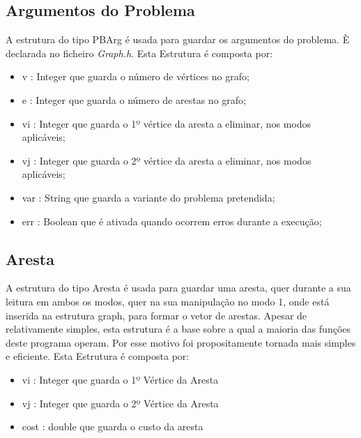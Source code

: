 \documentclass[14pt]{article}
\begin{document}
    \subsection[PBArg]{Argumentos do Problema}\label{subsec:argumentos.problema}
    A estrutura do tipo PBArg é usada para guardar os argumentos do problema. È declarada no ficheiro \emph{Graph.h}.
    Esta Estrutura é composta por:
    \begin{itemize}
        \item v : Integer que guarda o número de vértices no grafo;
        \item e : Integer que guarda o número de arestas no grafo;
        \item vi : Integer que guarda o 1º vértice da aresta a eliminar, nos modos aplicáveis;
        \item vj : Integer que guarda o 2º vértice da aresta a eliminar, nos modos aplicáveis;
        \item var : String que guarda a variante do problema pretendida;
        \item err : Boolean que é ativada quando ocorrem erros durante a execução;
    \end{itemize}

    \subsection[edge]{Aresta}\label{subsec:aresta}
    A estrutura do tipo Aresta é usada para guardar uma aresta, quer durante a sua leitura em ambos os modos, quer na
    sua manipulação no modo 1, onde está inserida na estrutura graph, para formar o vetor de arestas. Apesar de
    relativamente simples, esta estrutura é a base sobre a qual a maioria das funções deste programa operam. Por esse
    motivo foi propositamente tornada mais simples e eficiente.
    Esta Estrutura é composta por:
    \begin{itemize}
        \item vi : Integer que guarda o 1º Vértice da Aresta
        \item vj : Integer que guarda o 2º Vértice da Aresta
        \item cost : double que guarda o custo da aresta
    \end{itemize}
\end{document}
